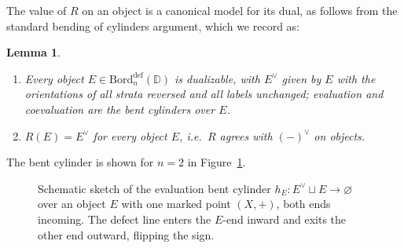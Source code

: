 \documentclass[11pt]{article}
\newtheorem{lemma}[theorem]{Lemma}
\theoremstyle{definition}
\newcommand{\bD}{\mathbb{D}}
\newcommand{\Bord}{\mathrm{Bord}}
\begin{document}
The value of $R$ on an object is a canonical model for its dual, as follows from the standard bending of cylinders argument, which we record as:

\begin{lemma}
\label{lem:Rvsdual}
\leavevmode
\begin{enumerate}
  \item Every object $E \in \Bord_n^{\textrm{def}}(\bD)$ is dualizable, with $E^\vee$ given by $E$ with the orientations of all strata reversed and all labels unchanged; evaluation and coevaluation are the bent cylinders over $E$.
  \item $R(E) = E^\vee$ for every object $E$, i.e.\ $R$ agrees with $(-)^\vee$ on objects.
\end{enumerate}
\end{lemma}


The bent cylinder is shown for $n = 2$ in Figure~\ref{fig:bentcylinder}.

\begin{figure}[ht]
\centering
{}
\caption{Schematic sketch of the evaluation bent cylinder $h_E \colon E^\vee \sqcup E \to \varnothing$ over an object $E$ with one marked point $(X,+)$, both ends incoming. The defect line enters the $E$-end inward and exits the other end outward, flipping the sign.}
\label{fig:bentcylinder}
\end{figure}
\end{document}
